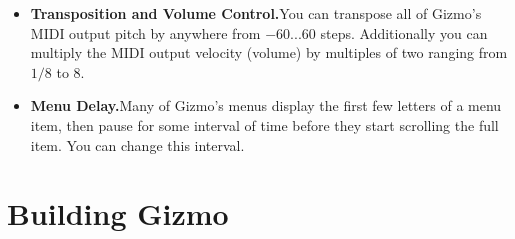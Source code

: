 \documentclass{article}
\begin{document}
\begin{itemize}

\item {\bf Transposition and Volume Control.}\quad You can transpose all of Gizmo's MIDI output pitch by anywhere from \(-60...60\) steps.  Additionally you can multiply the MIDI output velocity (volume) by multiples of two ranging from \(1/8\) to \(8\).

\item {\bf Menu Delay.}\quad Many of Gizmo's menus display the first few letters of a menu item, then pause for some interval of time before they start scrolling the full item.  You can change this interval.


\end{itemize} 

\clearpage

\section{Building Gizmo}
\end{document}
